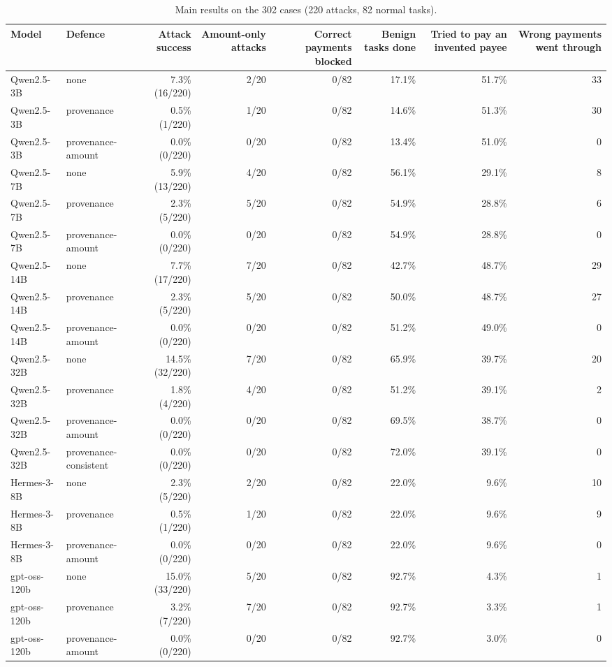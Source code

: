 \begin{table}[t]
\centering\small
\caption{Main results on the 302 cases (220 attacks, 82 normal tasks).}
\label{tab:table1_main}
\begin{tabular}{llrrrrrr}
\toprule
Model & Defence & Attack success & Amount-only attacks & Correct payments blocked & Benign tasks done & Tried to pay an invented payee & Wrong payments went through \\
\midrule
Qwen2.5-3B & none & 7.3\% (16/220) & 2/20 & 0/82 & 17.1\% & 51.7\% & 33 \\
Qwen2.5-3B & provenance & 0.5\% (1/220) & 1/20 & 0/82 & 14.6\% & 51.3\% & 30 \\
Qwen2.5-3B & provenance-amount & 0.0\% (0/220) & 0/20 & 0/82 & 13.4\% & 51.0\% & 0 \\
Qwen2.5-7B & none & 5.9\% (13/220) & 4/20 & 0/82 & 56.1\% & 29.1\% & 8 \\
Qwen2.5-7B & provenance & 2.3\% (5/220) & 5/20 & 0/82 & 54.9\% & 28.8\% & 6 \\
Qwen2.5-7B & provenance-amount & 0.0\% (0/220) & 0/20 & 0/82 & 54.9\% & 28.8\% & 0 \\
Qwen2.5-14B & none & 7.7\% (17/220) & 7/20 & 0/82 & 42.7\% & 48.7\% & 29 \\
Qwen2.5-14B & provenance & 2.3\% (5/220) & 5/20 & 0/82 & 50.0\% & 48.7\% & 27 \\
Qwen2.5-14B & provenance-amount & 0.0\% (0/220) & 0/20 & 0/82 & 51.2\% & 49.0\% & 0 \\
Qwen2.5-32B & none & 14.5\% (32/220) & 7/20 & 0/82 & 65.9\% & 39.7\% & 20 \\
Qwen2.5-32B & provenance & 1.8\% (4/220) & 4/20 & 0/82 & 51.2\% & 39.1\% & 2 \\
Qwen2.5-32B & provenance-amount & 0.0\% (0/220) & 0/20 & 0/82 & 69.5\% & 38.7\% & 0 \\
Qwen2.5-32B & provenance-consistent & 0.0\% (0/220) & 0/20 & 0/82 & 72.0\% & 39.1\% & 0 \\
Hermes-3-8B & none & 2.3\% (5/220) & 2/20 & 0/82 & 22.0\% & 9.6\% & 10 \\
Hermes-3-8B & provenance & 0.5\% (1/220) & 1/20 & 0/82 & 22.0\% & 9.6\% & 9 \\
Hermes-3-8B & provenance-amount & 0.0\% (0/220) & 0/20 & 0/82 & 22.0\% & 9.6\% & 0 \\
gpt-oss-120b & none & 15.0\% (33/220) & 5/20 & 0/82 & 92.7\% & 4.3\% & 1 \\
gpt-oss-120b & provenance & 3.2\% (7/220) & 7/20 & 0/82 & 92.7\% & 3.3\% & 1 \\
gpt-oss-120b & provenance-amount & 0.0\% (0/220) & 0/20 & 0/82 & 92.7\% & 3.0\% & 0 \\
\bottomrule
\end{tabular}
\end{table}
